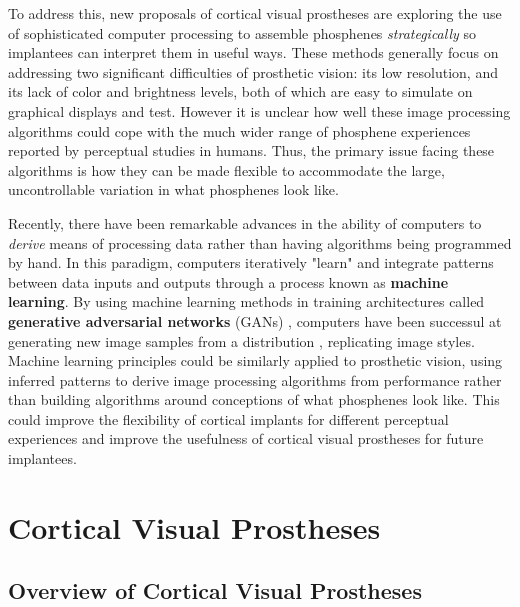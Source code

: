 \documentclass[a4paper,11pt,openany]{book}
\begin{document}
To address this, new proposals of cortical visual prostheses are exploring the use of sophisticated computer processing to assemble phosphenes \emph{strategically} so implantees can interpret them in useful ways. \cite{foroushani_cortical_2018,barnes_role_2012}
These methods generally focus on addressing two significant difficulties of prosthetic vision: its low resolution, and its lack of color and brightness levels, both of which are easy to simulate on graphical displays and test.  \cite{buffoni_image_2005,chang_facial_2012,sharmili_comparative_2017}
However it is unclear how well these image processing algorithms could cope with the much wider range of phosphene experiences reported by perceptual studies in humans.
Thus, the primary issue facing these algorithms is how they can be made flexible to accommodate the large, uncontrollable variation in what phosphenes look like.

Recently, there have been remarkable advances in the ability of computers to \emph{derive} means of processing data rather than having algorithms being programmed by hand.
In this paradigm, computers iteratively "learn" and integrate patterns between data inputs and outputs through a process known as \textbf{machine learning}.  \cite{guo_deep_2016}
By using machine learning methods in training architectures called \textbf{generative adversarial networks} (GANs) , computers have been successul at generating new image samples from a distribution \cite{NIPS2014_54230}, replicating image styles. \cite{gatys_image_2016}
Machine learning principles could be similarly applied to prosthetic vision, using inferred patterns to derive image processing algorithms from performance rather than building algorithms around conceptions of what phosphenes look like.
This could improve the flexibility of cortical implants for different perceptual experiences and improve the usefulness of cortical visual prostheses for future implantees.


\clearpage

\chapter{Cortical Visual Prostheses}
\label{sec:orgf5e4c1c}
\label{org08cc7af}

\section*{Overview of Cortical Visual Prostheses}
\label{sec:orgeee4c03}
\end{document}
